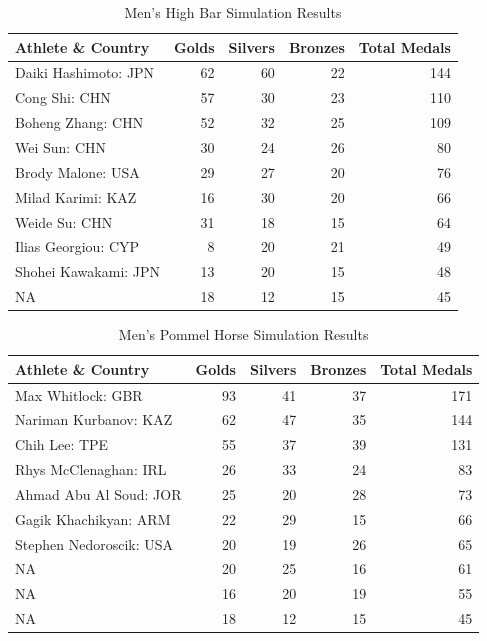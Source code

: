 \documentclass[
  letterpaper,
  DIV=11,
  numbers=noendperiod]{scrartcl}
\begin{document}
\begin{table}[H]

\caption{Men's High Bar Simulation Results }
\centering
\fontsize{9}{11}\selectfont
\begin{tabular}[t]{l|r|r|r|r}
\hline
Athlete \& Country & Golds & Silvers & Bronzes & Total Medals\\
\hline
Daiki Hashimoto: JPN & 62 & 60 & 22 & 144\\
\hline
Cong Shi: CHN & 57 & 30 & 23 & 110\\
\hline
Boheng Zhang: CHN & 52 & 32 & 25 & 109\\
\hline
Wei Sun: CHN & 30 & 24 & 26 & 80\\
\hline
Brody Malone: USA & 29 & 27 & 20 & 76\\
\hline
Milad Karimi: KAZ & 16 & 30 & 20 & 66\\
\hline
Weide Su: CHN & 31 & 18 & 15 & 64\\
\hline
Ilias Georgiou: CYP & 8 & 20 & 21 & 49\\
\hline
Shohei Kawakami: JPN & 13 & 20 & 15 & 48\\
\hline
NA & 18 & 12 & 15 & 45\\
\hline
\end{tabular}
\end{table}

\begin{table}[H]

\caption{Men's Pommel Horse Simulation Results }
\centering
\fontsize{9}{11}\selectfont
\begin{tabular}[t]{l|r|r|r|r}
\hline
Athlete \& Country & Golds & Silvers & Bronzes & Total Medals\\
\hline
Max Whitlock: GBR & 93 & 41 & 37 & 171\\
\hline
Nariman Kurbanov: KAZ & 62 & 47 & 35 & 144\\
\hline
Chih Lee: TPE & 55 & 37 & 39 & 131\\
\hline
Rhys McClenaghan: IRL & 26 & 33 & 24 & 83\\
\hline
Ahmad Abu Al Soud: JOR & 25 & 20 & 28 & 73\\
\hline
Gagik Khachikyan: ARM & 22 & 29 & 15 & 66\\
\hline
Stephen Nedoroscik: USA & 20 & 19 & 26 & 65\\
\hline
NA & 20 & 25 & 16 & 61\\
\hline
NA & 16 & 20 & 19 & 55\\
\hline
NA & 18 & 12 & 15 & 45\\
\hline
\end{tabular}
\end{table}
\end{document}
